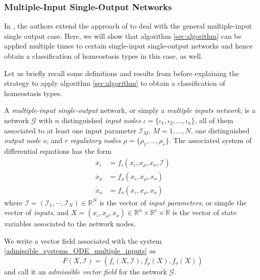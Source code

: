 \documentclass[pdflatex,sn-basic,Numbered]{sn-jnl}
\theoremstyle{thmstyleone}%
\numberwithin{equation}{section}
\begin{document}
\subsubsection{Multiple-Input Single-Output Networks}\label{sec:miso}

In \cite{madeira2024}, the authors extend the approach of \cite{WHAG21, madeira2022homeostasis} to deal with the general multiple-input single output case.
Here, we will show that algorithm \ref{sec:algorithm} can be applied multiple times to certain single-input single-output networks and hence obtain a classification of homeostasis types in this case, as well.

Let us briefly recall some
definitions and results from  \cite{madeira2024} before explaining the strategy to apply algorithm \ref{sec:algorithm} to obtain a classification of homeostasis types.

A \emph{multiple-input single-output} network, or simply a \emph{multiple inputs network}, is a network $\mathcal{G}$ with $n$ distinguished \emph{input nodes} $\iota=\{\iota_{1}, \iota_{2}, \ldots, \iota_{n}\}$, all of them associated to at least one input parameter $\mathcal{I}_{M}$, $M = 1, \ldots, N$, one distinguished \emph{output node} $o$, and $r$ \emph{regulatory nodes} $\rho=\{\rho_1,\ldots,\rho_r\}$.
The associated system of differential equations has the form
\begin{equation} \label{admissible_systems_ODE_multiple_inputs}
\begin{aligned}
\dot{x}_{\iota} & = f_{\iota}(x_{\iota}, x_{\rho}, x_{o}, \mathcal{I}) \\
\dot{x}_{\rho} & = f_{\rho}(x_{\iota}, x_{\rho}, x_{o})\\
\dot{x}_{o} & = f_{o}(x_{\iota}, x_{\rho}, x_{o})
\end{aligned}
\end{equation}
where $\mathcal{I} = (\mathcal{I}_{1}, \cdots, \mathcal{I}_{N}) \in\mathbb{R}^{N}$ is the vector of \emph{input parameters}, or simple the vector of \emph{inputs}, and $X=(x_{\iota},x_{\rho},x_o)\in\mathbb{R}^n\times\mathbb{R}^r \times\mathbb{R}$ is the vector of state variables associated to the network nodes.

We write a vector field associated with the system \eqref{admissible_systems_ODE_multiple_inputs} as
\[
F(X,\mathcal{I})=(f_{\iota}(X,\mathcal{I}),f_\rho(X),f_o(X))
\]
and call it an \emph{admissible vector field} for the network $\mathcal{G}$.
\end{document}
